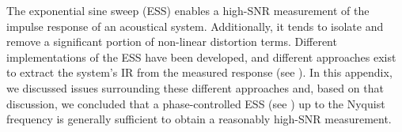 The exponential sine sweep (ESS) enables a high-SNR measurement of the impulse response of an acoustical system.
Additionally, it tends to isolate and remove a significant portion of non-linear distortion terms.
Different implementations of the ESS have been developed, and different approaches exist to extract the system's IR from the measured response (see ).
In this appendix, we discussed issues surrounding these different approaches and, based on that discussion, we concluded that a phase-controlled ESS (see ) up to the Nyquist frequency is generally sufficient to obtain a reasonably high-SNR measurement.